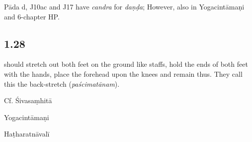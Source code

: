 \begin{ekdosis}
\begin{philcomm}[hp01_027]
Pāda d, J10ac and J17 have \emph{candra} for \emph{daṇḍa}; However,  also in Yogacintāmaṇi and 6-chapter HP.
\end{philcomm}

\subsection*{1.28}
\begin{translation} should stretch out both feet on the ground like staffs, hold the ends of both feet with the hands, place the forehead upon the knees and remain thus. They call this the back-stretch (\emph{paścimatānam}).
\end{translation}

\begin{sources}[hp01_028]
Cf. Śivasaṃhitā

\begin{versinnote}
\end{versinnote}

\end{sources}

\begin{testimonia}[hp01_028]
Yogacintāmaṇi

\begin{versinnote}
\end{versinnote}

Haṭharatnāvalī

\begin{versinnote}
\end{versinnote}

\end{testimonia}


\end{ekdosis}
